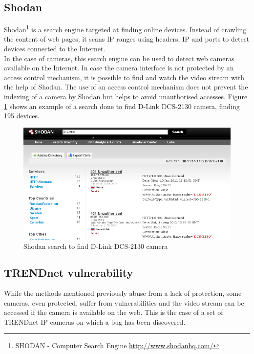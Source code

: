 \subsection{Shodan}
\label{sec:shodanhq}

Shodan\footnote{SHODAN - Computer Search Engine \url{http://www.shodanhq.com/}} is a search engine targeted at finding online devices.
Instead of crawling the content of web pages, it scans IP ranges using headers, IP and ports to detect devices connected to the Internet.\\

In the case of cameras, this search engine can be used to detect web cameras available on the Internet.
In case the camera interface is not protected by an access control mechanism, it is possible to find and watch the video stream with the help of Shodan.
The use of an access control mechanism does not prevent the indexing of a camera by Shodan but helps to avoid unauthorised accesses.
Figure \ref{fig:shodan-dcs} shows an example of a search done to find D-Link DCS-2130 camera, finding 195 devices.

\begin{figure}[h]
  \centering
  \includegraphics[width=\textwidth]{images/shodan-dcs.png}
  \caption{Shodan search to find D-Link DCS-2130 camera}
  \label{fig:shodan-dcs}
\end{figure}

\subsection{TRENDnet vulnerability}
\label{sec:trendnet-hack}

While the methods mentioned previously abuse from a lack of protection, some cameras, even protected, suffer from vulnerabilities and the video stream can be accessed if the camera is available on the web.
This is the case of a set of TRENDnet IP cameras on which a bug has been discovered.\\

